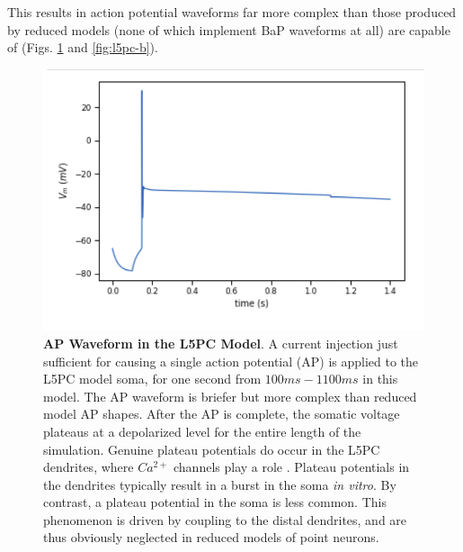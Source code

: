 
This results in action potential waveforms far more complex than those produced by reduced models (none of which implement BaP waveforms at all) are capable of (Figs. \ref{fig:l5pc-a} and \ref{fig:l5pc-b}).

\begin{figure}
\centering
\includegraphics[scale=0.8]{figures/correct_active_l5pc.png}
\caption[AP Waveform in the L5PC Model (A)]{\textbf{AP Waveform in the L5PC Model}.
A current injection just sufficient for causing a single action potential (AP) is applied to the L5PC model soma, for one second from $100ms-1100ms$ in this model.
The AP waveform is briefer but more complex than reduced model AP shapes.
After the AP is complete, the somatic voltage plateaus at a depolarized level for the entire length of the simulation.
Genuine plateau potentials do occur in the L5PC dendrites, where $Ca^{2+}$ channels play a role \citep{zhu2000maturation}.
Plateau potentials in the dendrites typically result in a burst in the soma \emph{in vitro}. 
By contrast, a plateau potential in the soma is less common.
This phenomenon is driven by coupling to the distal dendrites, and are thus obviously neglected in reduced models of point neurons.}
\label{fig:l5pc-a}
\end{figure}

